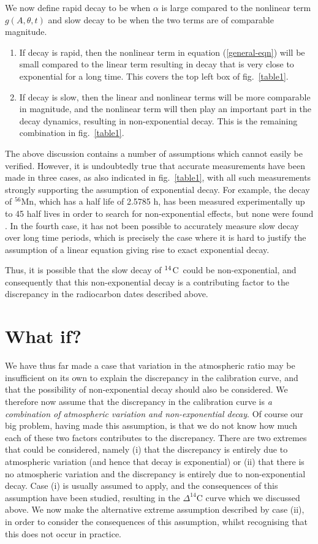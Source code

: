 \documentclass[12pt]{article}
\newcommand{\Ref}[1]{(\ref{#1})}
\newcommand{\cft}{$^{\rm 14}$C}
\begin{document}
We now define rapid decay to be when $\alpha$ is large compared to 
the nonlinear term $g(A,\theta,t)$ and slow decay to be when the two terms 
are of comparable magnitude.
\begin{enumerate}
\item
If decay is rapid, then
the nonlinear term in equation \Ref{general-eqn} will be small compared 
to the linear term resulting in decay that is very close to exponential for
a long time. This covers the top left box of fig.~\ref{table1}.
\item
If decay is slow, then the linear and nonlinear 
terms will be more comparable in magnitude, and the nonlinear 
term will then play an important part in the decay dynamics, resulting
in non-exponential decay. This is the remaining combination in 
fig.~\ref{table1}.
\end{enumerate}

The above discussion contains a number of assumptions which cannot easily be
verified. However, it is undoubtedly true that accurate measurements 
have been made in three cases, as also indicated in fig.~\ref{table1}, 
with all such measurements strongly supporting the assumption of 
exponential decay. For example, the decay of $^{56}$Mn, which has a
half life of 2.5785 h, has been measured experimentally up to 45 half lives
in order to search for non-exponential effects, but none were found
\cite{norman88}. In the fourth case, it has not been possible to 
accurately measure slow decay over long time periods, which
is precisely the case where it is hard to justify the assumption of a linear
equation giving rise to exact exponential decay. 

Thus, it is possible that the slow decay of \cft~could be 
non-exponential, and consequently that this non-exponential decay is a 
contributing factor to the discrepancy in the radiocarbon dates described 
above.


\section{What if?}
\label{whatif}

We have thus far made a case that variation in the atmospheric ratio may be
insufficient on its own to explain the discrepancy in the calibration
curve, and that the possibility of non-exponential decay should also be
considered. We therefore now assume that the discrepancy in the 
calibration curve is {\em a combination of atmospheric variation and 
non-exponential decay}. Of course our big problem,
having made this assumption, is that we do not know how much each of these
two factors contributes to the discrepancy. There are two extremes that
could be considered, namely (i) that the discrepancy is
entirely due to atmospheric variation (and hence that decay is exponential) 
or (ii) that there is no atmospheric variation and the discrepancy is 
entirely due to non-exponential decay. 
Case (i) is usually assumed to apply, and the consequences of this
assumption have been studied, resulting in the $\Delta^{14}$C curve 
which we discussed above. We now make the alternative
extreme assumption described by case (ii), in order to consider the 
consequences of this assumption, whilst recognising that this does not
occur in practice.
\end{document}
